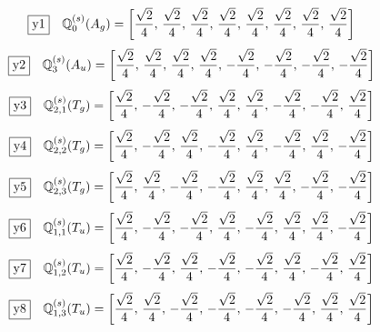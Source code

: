 \documentclass[fleqn,10pt,landscape]{jsarticle}
\begin{document}
\begin{dmath*}
\fbox{y1}\quad \mathbb{Q}_{0}^{(s)}(A_{g})=\left[ \frac{\sqrt{2}}{4},\, \frac{\sqrt{2}}{4},\, \frac{\sqrt{2}}{4},\, \frac{\sqrt{2}}{4},\, \frac{\sqrt{2}}{4},\, \frac{\sqrt{2}}{4},\, \frac{\sqrt{2}}{4},\, \frac{\sqrt{2}}{4} \right]
\end{dmath*}
\begin{dmath*}
\fbox{y2}\quad \mathbb{Q}_{3}^{(s)}(A_{u})=\left[ \frac{\sqrt{2}}{4},\, \frac{\sqrt{2}}{4},\, \frac{\sqrt{2}}{4},\, \frac{\sqrt{2}}{4},\, - \frac{\sqrt{2}}{4},\, - \frac{\sqrt{2}}{4},\, - \frac{\sqrt{2}}{4},\, - \frac{\sqrt{2}}{4} \right]
\end{dmath*}
\begin{dmath*}
\fbox{y3}\quad \mathbb{Q}_{2,1}^{(s)}(T_{g})=\left[ \frac{\sqrt{2}}{4},\, - \frac{\sqrt{2}}{4},\, - \frac{\sqrt{2}}{4},\, \frac{\sqrt{2}}{4},\, \frac{\sqrt{2}}{4},\, - \frac{\sqrt{2}}{4},\, - \frac{\sqrt{2}}{4},\, \frac{\sqrt{2}}{4} \right]
\end{dmath*}
\begin{dmath*}
\fbox{y4}\quad \mathbb{Q}_{2,2}^{(s)}(T_{g})=\left[ \frac{\sqrt{2}}{4},\, - \frac{\sqrt{2}}{4},\, \frac{\sqrt{2}}{4},\, - \frac{\sqrt{2}}{4},\, \frac{\sqrt{2}}{4},\, - \frac{\sqrt{2}}{4},\, \frac{\sqrt{2}}{4},\, - \frac{\sqrt{2}}{4} \right]
\end{dmath*}
\begin{dmath*}
\fbox{y5}\quad \mathbb{Q}_{2,3}^{(s)}(T_{g})=\left[ \frac{\sqrt{2}}{4},\, \frac{\sqrt{2}}{4},\, - \frac{\sqrt{2}}{4},\, - \frac{\sqrt{2}}{4},\, \frac{\sqrt{2}}{4},\, \frac{\sqrt{2}}{4},\, - \frac{\sqrt{2}}{4},\, - \frac{\sqrt{2}}{4} \right]
\end{dmath*}
\begin{dmath*}
\fbox{y6}\quad \mathbb{Q}_{1,1}^{(s)}(T_{u})=\left[ \frac{\sqrt{2}}{4},\, - \frac{\sqrt{2}}{4},\, - \frac{\sqrt{2}}{4},\, \frac{\sqrt{2}}{4},\, - \frac{\sqrt{2}}{4},\, \frac{\sqrt{2}}{4},\, \frac{\sqrt{2}}{4},\, - \frac{\sqrt{2}}{4} \right]
\end{dmath*}
\begin{dmath*}
\fbox{y7}\quad \mathbb{Q}_{1,2}^{(s)}(T_{u})=\left[ \frac{\sqrt{2}}{4},\, - \frac{\sqrt{2}}{4},\, \frac{\sqrt{2}}{4},\, - \frac{\sqrt{2}}{4},\, - \frac{\sqrt{2}}{4},\, \frac{\sqrt{2}}{4},\, - \frac{\sqrt{2}}{4},\, \frac{\sqrt{2}}{4} \right]
\end{dmath*}
\begin{dmath*}
\fbox{y8}\quad \mathbb{Q}_{1,3}^{(s)}(T_{u})=\left[ \frac{\sqrt{2}}{4},\, \frac{\sqrt{2}}{4},\, - \frac{\sqrt{2}}{4},\, - \frac{\sqrt{2}}{4},\, - \frac{\sqrt{2}}{4},\, - \frac{\sqrt{2}}{4},\, \frac{\sqrt{2}}{4},\, \frac{\sqrt{2}}{4} \right]
\end{dmath*}
\vspace{5mm}
\end{document}
